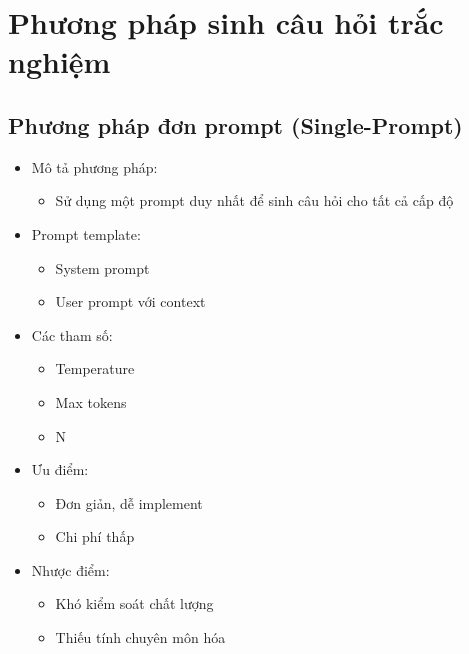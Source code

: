 \section{Phương pháp sinh câu hỏi trắc nghiệm}

\subsection{Phương pháp đơn prompt (Single-Prompt)}
\begin{itemize}
    \item Mô tả phương pháp:
    \begin{itemize}
        \item Sử dụng một prompt duy nhất để sinh câu hỏi cho tất cả cấp độ
    \end{itemize}
    \item Prompt template:
    \begin{itemize}
        \item System prompt
        \item User prompt với context
    \end{itemize}
    \item Các tham số:
    \begin{itemize}
        \item Temperature
        \item Max tokens
        \item N
    \end{itemize}
    \item Ưu điểm:
    \begin{itemize}
        \item Đơn giản, dễ implement
        \item Chi phí thấp
    \end{itemize}
    \item Nhược điểm:
    \begin{itemize}
        \item Khó kiểm soát chất lượng
        \item Thiếu tính chuyên môn hóa
    \end{itemize}
\end{itemize}

